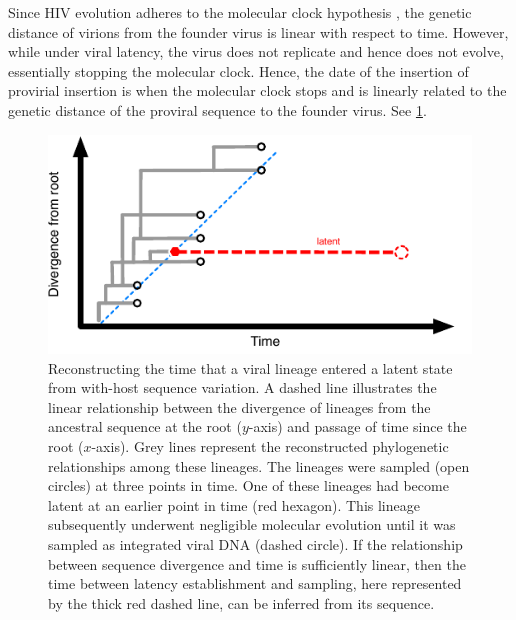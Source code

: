 \documentclass[12pt,onecolumn,twoside]{pnas-new}
\begin{document}
Since HIV evolution adheres to the molecular clock hypothesis \cite{Leitner99,Park16}, the genetic distance of virions from the founder virus is linear with respect to time.
However, while under viral latency, the virus does not replicate and hence does not evolve, essentially stopping the molecular clock.
Hence, the date of the insertion of provirial insertion is when the molecular clock stops and is linearly related to the genetic distance of the proviral sequence to the founder virus.
See \cref{fig:latenttree}.

\begin{figure}
\includegraphics{latency-scheme}
\caption{Reconstructing the time that a viral lineage entered a latent state from with-host sequence variation.
	A dashed line illustrates the linear relationship between the divergence of lineages from the ancestral sequence at the root ($y$-axis) and passage of time since the root ($x$-axis).
	Grey lines represent the reconstructed phylogenetic relationships among these lineages.
	The lineages were sampled (open circles) at three points in time.
	One of these lineages had become latent at an earlier point in time (red hexagon).
	This lineage subsequently underwent negligible molecular evolution until it was sampled as integrated viral DNA (dashed circle).
	If the relationship between sequence divergence and time is sufficiently linear, then the time between latency establishment and sampling, here represented by the thick red dashed line, can be inferred from its sequence.
}
\label{fig:latenttree}
\end{figure}
\end{document}
